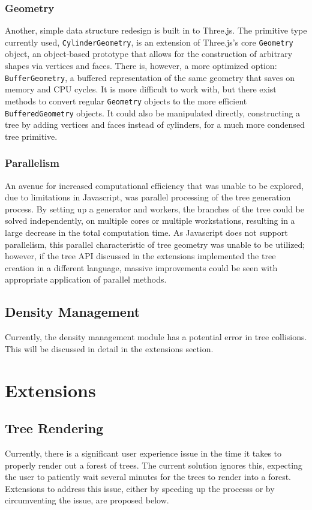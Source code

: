 \documentclass{article}
\newcommand{\tab}{\hspace*{2em}}
\begin{document}
            \subsubsection{Geometry}
    \tab Another, simple data structure redesign is built in to Three.js. The primitive type
currently used, \verb|CylinderGeometry|, is an extension of Three.js's core \verb|Geometry| object,
an object-based prototype that allows for the construction of arbitrary shapes via vertices and
faces. There is, however, a more optimized option: \verb|BufferGeometry|, a buffered representation
of the same geometry that saves on memory and CPU cycles. It is more difficult to work with, but
there exist methods to convert regular \verb|Geometry| objects to the more efficient
\verb|BufferedGeometry| objects. It could also be manipulated directly, constructing a tree by adding
vertices and faces instead of cylinders, for a much more condensed tree primitive.

            \subsubsection{Parallelism}
    \tab An avenue for increased computational efficiency that was unable to be explored, due to
limitations in Javascript, was parallel processing of the tree generation process. By setting up a
generator and workers, the branches of the tree could be solved independently, on multiple cores or
multiple workstations, resulting in a large decrease in the total computation time. As Javascript
does not support parallelism, this parallel characteristic of tree geometry was unable to be
utilized; however, if the tree API discussed in the extensions implemented the tree creation in a
different language, massive improvements could be seen with appropriate application of parallel
methods.

        \subsection{Density Management}
    \tab Currently, the density management module has a potential error in tree collisions. This
will be discussed in detail in the extensions section.

    \section{Extensions}
        \subsection{Tree Rendering}
    \tab Currently, there is a significant user experience issue in the time it takes to properly
render out a forest of trees. The current solution ignores this, expecting the user to patiently
wait several minutes for the trees to render into a forest. Extensions to address this issue,
either by speeding up the processs or by circumventing the issue, are proposed below.
\end{document}
